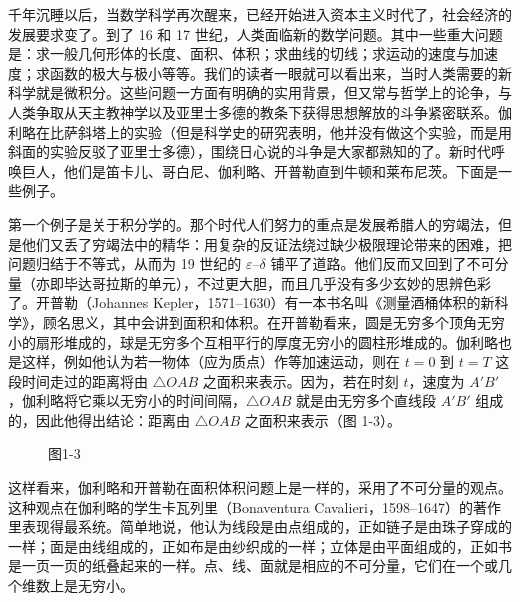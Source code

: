 千年沉睡以后，当数学科学再次醒来，已经开始进入资本主义时代了，社会经济的发展要求变了。到了 16 和 17 世纪，人类面临新的数学问题。其中一些重大问题是：求一般几何形体的长度、面积、体积；求曲线的切线；求运动的速度与加速度；求函数的极大与极小等等。我们的读者一眼就可以看出来，当时人类需要的新科学就是微积分。这些问题一方面有明确的实用背景，但又常与哲学上的论争，与人类争取从天主教神学以及亚里士多德的教条下获得思想解放的斗争紧密联系。伽利略在比萨斜塔上的实验（但是科学史的研究表明，他并没有做这个实验，而是用斜面的实验反驳了亚里士多德），围绕日心说的斗争是大家都熟知的了。新时代呼唤巨人，他们是笛卡儿、哥白尼、伽利略、开普勒直到牛顿和莱布尼茨。下面是一些例子。

第一个例子是关于积分学的。那个时代人们努力的重点是发展希腊人的穷竭法，但是他们又丢了穷竭法中的精华：用复杂的反证法绕过缺少极限理论带来的困难，把问题归结于不等式，从而为 19 世纪的 $\varepsilon$--$\delta$ 铺平了道路。他们反而又回到了不可分量（亦即毕达哥拉斯的单元），不过更大胆，而且几乎没有多少玄妙的思辨色彩了。开普勒（Johannes Kepler，1571--1630）有一本书名叫《测量酒桶体积的新科学》，顾名思义，其中会讲到面积和体积。在开普勒看来，圆是无穷多个顶角无穷小的扇形堆成的，球是无穷多个互相平行的厚度无穷小的圆柱形堆成的。伽利略也是这样，例如他认为若一物体（应为质点）作等加速运动，则在 $t=0$ 到 $t=T$ 这段时间走过的距离将由 $\triangle OAB$ 之面积来表示。因为，若在时刻 $t$，速度为 $A'B'$，伽利略将它乘以无穷小的时间间隔，$\triangle OAB$ 就是由无穷多个直线段 $A'B'$ 组成的，因此他得出结论：距离由 $\triangle OAB$ 之面积来表示（图 1-3）。

\begin{figure}[htbp]
\centering
{}
\caption*{图1-3}
\end{figure}

这样看来，伽利略和开普勒在面积体积问题上是一样的，采用了不可分量的观点。这种观点在伽利略的学生卡瓦列里（Bonaventura Cavalieri，1598--1647）的著作里表现得最系统。简单地说，他认为线段是由点组成的，正如链子是由珠子穿成的一样；面是由线组成的，正如布是由纱织成的一样；立体是由平面组成的，正如书是一页一页的纸叠起来的一样。点、线、面就是相应的不可分量，它们在一个或几个维数上是无穷小。

